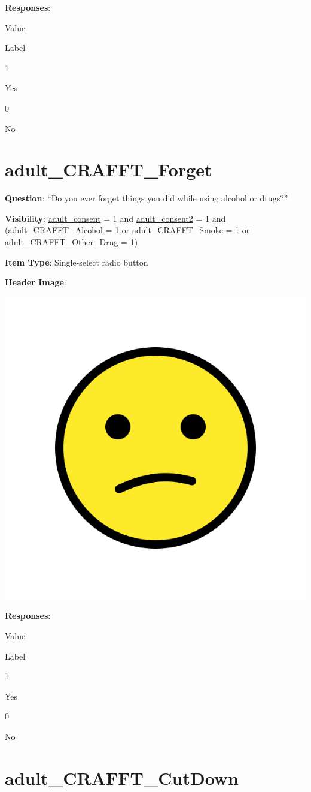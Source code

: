 \documentclass[]{book}
\begin{document}
\textbf{Responses}:

Value

Label

1

Yes

0

No

\hypertarget{adult_crafft_forget}{%
\section{adult\_CRAFFT\_Forget}\label{adult_crafft_forget}}

\textbf{Question}: ``Do you ever forget things you did while using alcohol or drugs?''

\textbf{Visibility}: \protect\hyperlink{adult_consent}{adult\_consent} = 1 and \protect\hyperlink{adult_consent2}{adult\_consent2} = 1 and (\protect\hyperlink{adult_crafft_alcohol}{adult\_CRAFFT\_Alcohol} = 1 or \protect\hyperlink{adult_crafft_smoke}{adult\_CRAFFT\_Smoke} = 1 or \protect\hyperlink{adult_crafft_other_drug}{adult\_CRAFFT\_Other\_Drug} = 1)

\textbf{Item Type}: Single-select radio button

\textbf{Header Image}:

\begin{flushleft}\includegraphics[width=0.33\linewidth]{downloadFigs4latex_HBN_PMHS_Codebook/adult_CRAFFT_Forget_headerImg} \end{flushleft}

\textbf{Responses}:

Value

Label

1

Yes

0

No

\hypertarget{adult_crafft_cutdown}{%
\section{adult\_CRAFFT\_CutDown}\label{adult_crafft_cutdown}}
\end{document}
